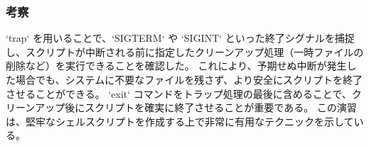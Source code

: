 \documentclass[a4paper,11pt]{jsarticle}
\begin{document}
\subsubsection*{考察}
`trap` を用いることで、`SIGTERM` や `SIGINT` といった終了シグナルを捕捉し、スクリプトが中断される前に指定したクリーンアップ処理（一時ファイルの削除など）を実行できることを確認した。
これにより、予期せぬ中断が発生した場合でも、システムに不要なファイルを残さず、より安全にスクリプトを終了させることができる。
`exit` コマンドをトラップ処理の最後に含めることで、クリーンアップ後にスクリプトを確実に終了させることが重要である。
この演習は、堅牢なシェルスクリプトを作成する上で非常に有用なテクニックを示している。
\end{document}
